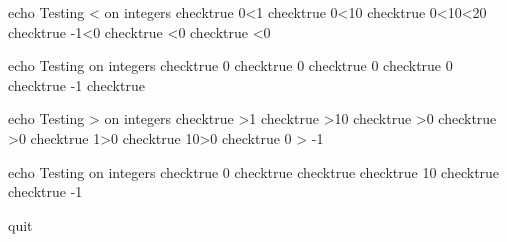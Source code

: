 echo     Testing < on integers
checktrue 0<1
checktrue 0<10
checktrue 0<10<20
checktrue -1<0
checktrue <0
checktrue <0

echo     Testing \leq on integers
checktrue 0 
checktrue 0 
checktrue 0 
checktrue 0  
checktrue -1 
checktrue  

echo     Testing > on integers
checktrue >1
checktrue >10
checktrue >0
checktrue >0
checktrue 1>0
checktrue 10>0
checktrue 0 > -1

echo     Testing \geq on integers
checktrue       0 
checktrue  
checktrue  
checktrue       10 
checktrue  
checktrue       -1 

quit
